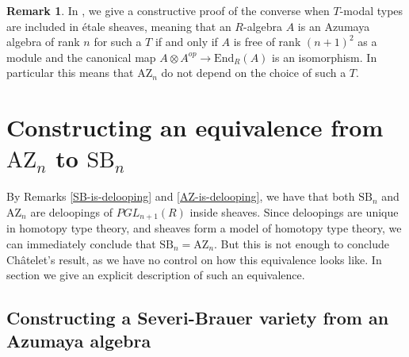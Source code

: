 \documentclass[10pt,a4paper]{article}
\theoremstyle{definition}
\newtheorem{remark}[theorem]{Remark}
\newcommand{\SB}{\mathrm{SB}}
\newcommand{\AZ}{\mathrm{AZ}}
\newcommand{\propTrunc}[1]{\lVert #1 \rVert}
\begin{document}
\begin{remark}\label{azumaya-independent-modality}
In \cite{coqazumaya}, we give a constructive proof of the converse when $T$-modal types are included in étale sheaves, meaning that an $R$-algebra $A$ is an Azumaya algebra of rank $n$ for such a $T$ if and only if $A$ is free of rank $(n+1)^2$ as a module and the canonical map $A\otimes A^{op}\to \mathrm{End}_R(A)$ is an isomorphism. In particular this means that $\AZ_n$ do not depend on the choice of such a $T$.
\end{remark}




\section{Constructing an equivalence from $\AZ_n$ to $\SB_n$}

By Remarks \ref{SB-is-delooping} and \ref{AZ-is-delooping}, we have that both $\SB_n$ and $\AZ_n$ are deloopings of $PGL_{n+1}(R)$ inside sheaves. Since deloopings are unique in homotopy type theory, and sheaves form a model of homotopy type theory, we can immediately conclude that $\SB_n = \AZ_n$. But this is not enough to conclude Ch\^atelet's result, as we have no control on how this equivalence looks like. In section we give an explicit description of such an equivalence.


\subsection{Constructing a Severi-Brauer variety from an Azumaya algebra}
\end{document}
